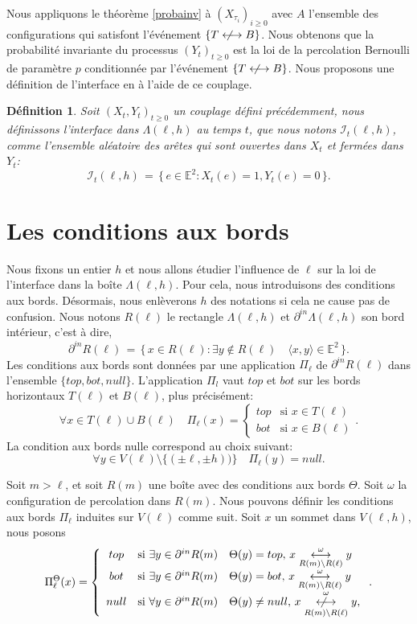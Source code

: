 \documentclass[titlepage,a4paper,12pt]{article}
\newcounter{def}
\newcounter{prop}
\newcounter{cor}
\newtheorem{interface}[def]{Définition}
\newcommand{\nlongleftrightarrow}{\longleftrightarrow \kern-15pt\not \kern15pt}
\begin{document}
Nous appliquons le théorème \ref{probainv} à $(X_{\tau_i})_{i\geqslant 0}$ avec $A$ l'ensemble des configurations qui satisfont l'événement $\{T\nlongleftrightarrow B\}$. Nous obtenons que la probabilité invariante du processus $(Y_t)_{t\geqslant 0}$ est la loi de la percolation Bernoulli de paramètre $p$ conditionnée par l'événement $\{T\nlongleftrightarrow B\}$.
Nous proposons une définition de l'interface en à l'aide de ce  couplage.
\begin{interface}
Soit $(X_t,Y_t)_{t\geqslant 0}$ un couplage défini précédemment, nous définissons l'interface dans $\Lambda({\ell,h})$ au temps $t$, que nous notons $\mathcal{I}_t({\ell,h})$, comme l'ensemble aléatoire des arêtes qui sont ouvertes dans $X_t$ et fermées dans $Y_t$: $$ \mathcal{I}_t({\ell,h}) \,=\, \big\{ \,e\in \mathbb{E}^2: X_t(e) = 1, Y_t(e) = 0 \, \big\}.
$$
\end{interface}
\section{Les conditions aux bords}
Nous fixons un entier $h$ et nous allons étudier l'influence de $\ell$ sur la loi de l'interface dans la boîte $\Lambda(\ell,h)$. Pour cela, nous introduisons des conditions aux bords. Désormais, nous enlèverons $h$ des notations si cela ne cause pas de confusion. Nous notons $R(\ell)$ le rectangle $\Lambda(\ell,h)$ et  $\partial^{in}\Lambda(\ell,h)$ son bord intérieur, c'est à dire,
$$ \partial^{in}R(\ell) \,=\, \big\{ \, x\in R(\ell): \exists y \notin R(\ell) \quad \langle x,y\rangle\in \mathbb{E}^2\, \big\}.
$$
Les conditions aux bords sont données par une application $\Pi_{\ell}$ de $\partial^{in}R(\ell)$ dans l'ensemble $\{top,bot,null\}$.
L'application $\Pi_{l}$ vaut $top$ et $bot$ sur les bords horizontaux $T(\ell)$ et $B(\ell)$, plus précisément:
$$ \forall x\in T(\ell)\cup B(\ell) \quad \Pi_{\ell}(x) = \left\lbrace \begin{array}{ll}
top & \text{si }x\in T(\ell)\\
bot & \text{si }x\in B(\ell)
\end{array}
\right..
$$ 
La condition aux bords nulle correspond au choix suivant:
$$\forall y\in V(\ell)\setminus \{(\pm \ell,\pm h))\} \quad \Pi_{\ell}(y) = null.
$$

Soit $m> \ell$, et soit $R(m)$ une boîte avec des conditions aux bords $\Theta$. Soit $\omega$ la configuration de percolation dans $R(m)$. Nous pouvons définir les conditions aux bords $\Pi_{\ell}$ induites sur $V(\ell)$ comme suit. Soit $x$ un sommet dans $V(\ell,h)$,  nous posons
$$\Pi^\Theta_{\ell}(x)=\left\lbrace \begin{array}{cl}
top &\text{si } \exists y \in \partial^{in}R(m) \quad \Theta(y) = top,\, x\overset{\omega}{\underset{R(m) \setminus R(\ell)}{\longleftrightarrow}} y\\
bot &\text{si } \exists y \in \partial^{in}R(m)\quad \Theta(y) = bot,\, x\overset{\omega}{\underset{R(m) \setminus R(\ell)}{\longleftrightarrow}} y\\
null &\text{si } \forall y \in \partial^{in}R(m)\quad \Theta(y) \neq null,\, x\overset{\omega}{\underset{R(m) \setminus R(\ell)}{\nlongleftrightarrow}} y,
\end{array} \right..
$$
\end{document}
